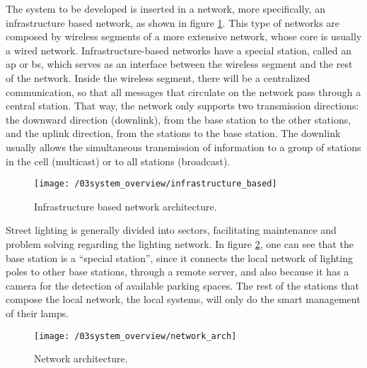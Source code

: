 The system to be developed is inserted in a network, more specifically, an infrastructure based network, as shown in figure \ref{fig:infr_based_arch}. This type of networks are composed by wireless segments of a more extensive network, whose core is usually a wired network. Infrastructure-based networks have a special station, called an \ac{ap} or \ac{bs}, which serves as an interface between the wireless segment and the rest of the network. Inside the wireless segment, there will be a centralized communication, so that all messages that circulate on the network pass through a central station. That way, the network only supports two transmission directions: the downward direction (downlink), from the base station to the other stations, and the uplink direction, from the stations to the base station. The downlink usually allows the simultaneous transmission of information to a group of stations in the cell (multicast) or to all stations (broadcast).

\begin{figure}[ht]
	\centering
	\texttt{[image: /03system\_overview/infrastructure\_based]}
	\caption{Infrastructure based network architecture.}
	\label{fig:infr_based_arch}
\end{figure}

Street lighting is generally divided into sectors, facilitating maintenance and problem solving regarding the lighting network. In figure \ref{fig:network_arch}, one can see that the base station is a “special station”, since it connects the local network of lighting poles to other base stations, through a remote server, and also because it has a camera for the detection of available parking spaces. The rest of the stations that compose the local network, the local systems, will only do the smart management of their lamps.

\begin{figure}[ht]
	\centering
	\texttt{[image: /03system\_overview/network\_arch]}
	\caption{Network architecture.}
	\label{fig:network_arch}
\end{figure}